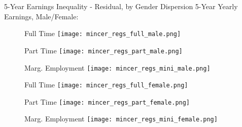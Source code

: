 \documentclass[hyperref={bookmarks=false}]{beamer}
\begin{document}
\begin{appendix}
\begin{frame}{5-Year Earnings Inequality - Residual, by Gender}
Dispersion 5-Year Yearly Earnings, Male/Female:
\begin{figure}[!t]
\begin{minipage}[b]{0.32\textwidth}{Full Time}
\centering
\texttt{[image: mincer\_regs\_full\_male.png]}
\end{minipage}
\begin{minipage}[b]{0.32\textwidth}{Part Time}
\centering
\texttt{[image: mincer\_regs\_part\_male.png]}
\end{minipage}
\begin{minipage}[b]{0.32\textwidth}{Marg. Employment}
\centering
\texttt{[image: mincer\_regs\_mini\_male.png]}
\end{minipage}
\begin{minipage}[b]{0.32\textwidth}{Full Time}
\centering
\texttt{[image: mincer\_regs\_full\_female.png]}
\end{minipage}
\begin{minipage}[b]{0.32\textwidth}{Part Time}
\centering
\texttt{[image: mincer\_regs\_part\_female.png]}
\end{minipage}
\begin{minipage}[b]{0.32\textwidth}{Marg. Employment}
\centering
\texttt{[image: mincer\_regs\_mini\_female.png]}
\end{minipage}
\end{figure}
\end{frame}



\end{appendix}
\end{document}
